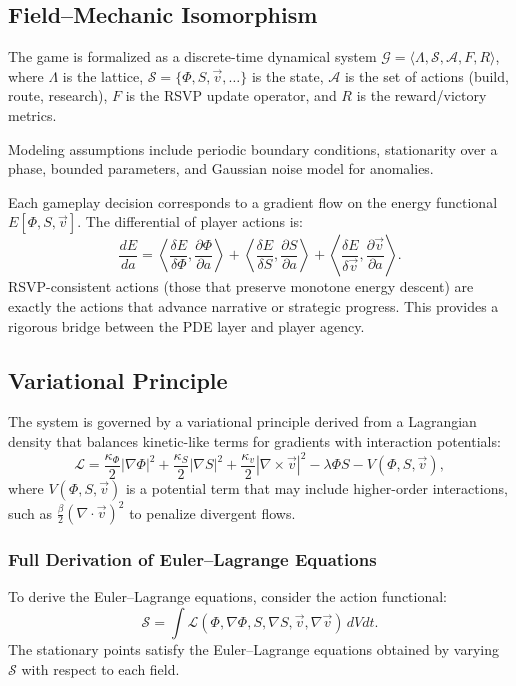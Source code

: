 \documentclass[12pt]{article}
\theoremstyle{definition}
\begin{document}
\subsection{Field–Mechanic Isomorphism}
\label{sec:field_mech_iso}

The game is formalized as a discrete-time dynamical system $\mathcal{G} = \langle \Lambda, \mathcal{S}, \mathcal{A}, F, R \rangle$, where $\Lambda$ is the lattice, $\mathcal{S} = \{\Phi,S,\vec v,\ldots\}$ is the state, $\mathcal{A}$ is the set of actions (build, route, research), $F$ is the RSVP update operator, and $R$ is the reward/victory metrics.

Modeling assumptions include periodic boundary conditions, stationarity over a phase, bounded parameters, and Gaussian noise model for anomalies.

Each gameplay decision corresponds to a gradient flow on the energy functional $E[\Phi,S,\vec v]$. The differential of player actions is:
\[
\frac{dE}{da} = \left\langle \frac{\delta E}{\delta \Phi}, \frac{\partial \Phi}{\partial a} \right\rangle
+ \left\langle \frac{\delta E}{\delta S}, \frac{\partial S}{\partial a} \right\rangle
+ \left\langle \frac{\delta E}{\delta \vec v}, \frac{\partial \vec v}{\partial a} \right\rangle.
\]
RSVP-consistent actions (those that preserve monotone energy descent) are exactly the actions that advance narrative or strategic progress. This provides a rigorous bridge between the PDE layer and player agency.

\subsection{Variational Principle}
The system is governed by a variational principle derived from a Lagrangian density that balances kinetic-like terms for gradients with interaction potentials:
\begin{equation}
\mathcal{L} = 
\frac{\kappa_\Phi}{2}|\nabla \Phi|^2 + 
\frac{\kappa_S}{2}|\nabla S|^2 +
\frac{\kappa_v}{2}|\nabla \times \vec{v}|^2
- \lambda \Phi S - V(\Phi, S, \vec{v}),
\end{equation}
where $V(\Phi, S, \vec{v})$ is a potential term that may include higher-order interactions, such as $\frac{\beta}{2} (\nabla \cdot \vec{v})^2$ to penalize divergent flows.

\subsubsection{Full Derivation of Euler–Lagrange Equations}
To derive the Euler–Lagrange equations, consider the action functional:
\[
\mathcal{S} = \int \mathcal{L}(\Phi, \nabla \Phi, S, \nabla S, \vec{v}, \nabla \vec{v}) \, dV dt.
\]
The stationary points satisfy the Euler–Lagrange equations obtained by varying $\mathcal{S}$ with respect to each field.
\end{document}
